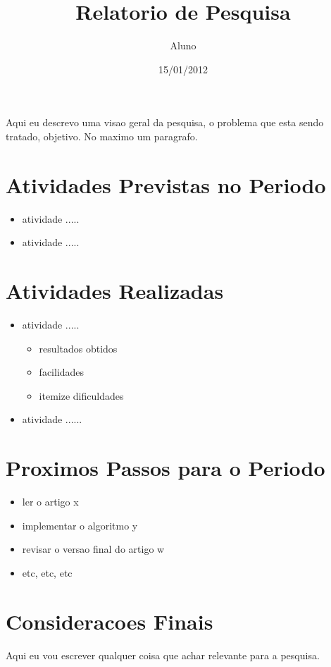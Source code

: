 \documentclass[12pt,a4paper]{article}
\begin{document}
\title{Relatorio de Pesquisa}
\author{Aluno}
\date{15/01/2012}

\maketitle

Aqui eu descrevo uma visao geral da pesquisa, o problema que esta sendo tratado, objetivo. No maximo um paragrafo.

\section{Atividades Previstas no Periodo}

\begin{itemize}
\item atividade .....
\item atividade .....
\end{itemize}

\section{Atividades Realizadas}

\begin{itemize}
\item atividade .....
    \begin{itemize} 
          \item resultados obtidos
          \item facilidades
          \item {itemize} dificuldades
     \end{itemize}
\item atividade  ......
\end{itemize}


\section{Proximos Passos para o  Periodo}

\begin{itemize}
\item ler o artigo x
\item implementar o algoritmo y
\item revisar o versao final do artigo w
\item etc, etc, etc
\end{itemize}

\section{Consideracoes Finais}

Aqui eu vou escrever qualquer coisa que achar relevante para a pesquisa.
\end{document}
